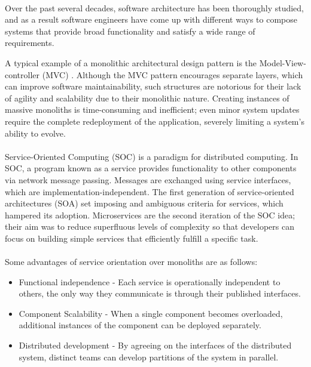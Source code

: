 \paragraph{}

Over the past several decades, software architecture has been thoroughly studied, and as a result software engineers have come up with different ways
to compose systems that provide broad functionality and satisfy a wide range of requirements.

A typical example of a monolithic architectural design pattern is the Model-View-controller (MVC) \cite{5}.
Although the MVC pattern encourages separate layers, which can improve software maintainability,
such structures are notorious for their lack of agility and scalability due to their monolithic nature.
Creating instances of massive monoliths is time-consuming and inefficient;
even minor system updates require the complete redeployment of the application, severely limiting a system's ability to evolve.

\paragraph{}

Service-Oriented Computing (SOC) \cite{6} is a paradigm for distributed computing.
In SOC, a program known as a service provides functionality to other components via network message passing.
Messages are exchanged using service interfaces, which are implementation-independent.
The first generation of service-oriented architectures (SOA) \cite{7} set imposing and ambiguous criteria for services, which hampered its adoption.
Microservices \cite{microservices} are the second iteration of the SOC idea;
their aim was to reduce superfluous levels of complexity so that developers can focus on building simple services that efficiently fulfill a specific task.

\paragraph{}

Some advantages of service orientation over monoliths are as follows:
\begin{itemize}
    \item Functional independence - Each service is operationally independent to others, the only way they communicate is through their published interfaces.
    \item Component Scalability - When a single component becomes overloaded, additional instances of the component can be deployed separately.
    \item Distributed development - By agreeing on the interfaces of the distributed system, distinct teams can develop partitions of the system in parallel.
\end{itemize}

